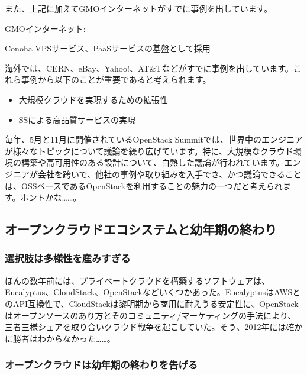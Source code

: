 \documentclass[8pt,b5paper,tombo,openany]{jsbook}
\begin{document}
また、上記に加えてGMOインターネットがすでに事例を出しています。

GMOインターネット:

Conoha VPSサービス、PaaSサービスの基盤として採用

海外では、CERN、eBay、Yahoo!、AT\&Tなどがすでに事例を出しています。これら事例から以下のことが重要であると考えられます。

\begin{itemize}
  \item 大規模クラウドを実現するための拡張性
  \item SSによる高品質サービスの実現
\end{itemize}

毎年、5月と11月に開催されているOpenStack Summitでは、世界中のエンジニアが様々なトピックについて議論を繰り広げています。特に、大規模なクラウド環境の構築や高可用性のある設計について、白熱した議論が行われています。エンジニアが会社を跨いで、他社の事例や取り組みを入手でき、かつ議論できることは、OSSベースであるOpenStackを利用することの魅力の一つだと考えられます。ホントかな……。

\subsection{オープンクラウドエコシステムと幼年期の終わり}

\subsubsection{選択肢は多様性を産みすぎる}

ほんの数年前には、プライベートクラウドを構築するソフトウェアは、Eucalyptus、CloudStack、OpenStackなどいくつかあった。EucalyptusはAWSとのAPI互換性で、CloudStackは黎明期から商用に耐えうる安定性に、OpenStackはオープンソースのあり方とそのコミュニティ/マーケティングの手法により、三者三様シェアを取り合いクラウド戦争を起こしていた。そう、2012年には確かに勝者はわからなかった……。

\subsubsection{オープンクラウドは幼年期の終わりを告げる}
\end{document}
